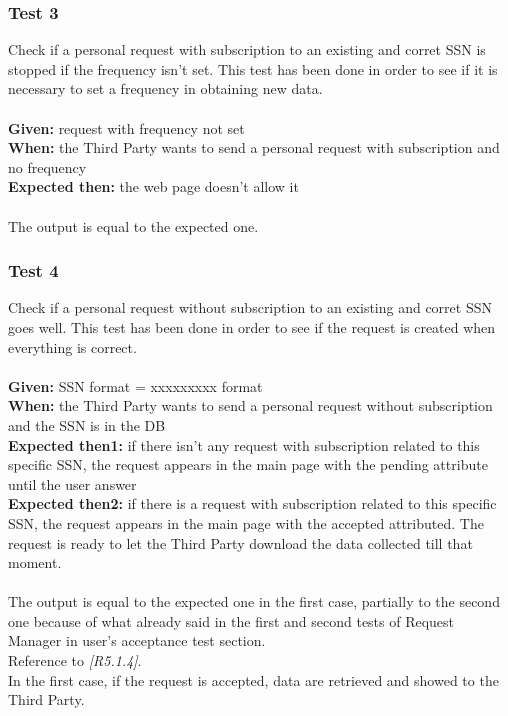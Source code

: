 \subsubsection{\Large{Test 3}}
Check if a personal request with subscription to an existing and corret SSN is stopped if the frequency isn't set. This test has been done in order to see if it is necessary to set a frequency in obtaining new data.\\
\\
\textbf{Given: } request with frequency not set  \\
\textbf{When: } the Third Party wants to send a personal request with subscription and no frequency \\
\textbf{Expected then: } the web page doesn't allow it\\
\\
The output is equal to the expected one.

\subsubsection{\Large{Test 4}}
Check if a personal request without subscription to an existing and corret SSN goes well. This test has been done in order to see if the request is created when everything is correct.\\
\\
\textbf{Given: } SSN format = xxxxxxxxx format \\
\textbf{When: } the Third Party wants to send a personal request without subscription and the SSN is in the DB \\
\textbf{Expected then1: } if there isn't any request with subscription related to this specific SSN, the request appears in the main page with the pending attribute until the user answer\\
\textbf{Expected then2: } if there is a request with subscription related to this specific SSN, the request appears in the main page with the accepted attributed. The request is ready to let the Third Party download the data collected till that moment.\\
\\
The output is equal to the expected one in the first case, partially to the second one because of what already said in the first and second tests of Request Manager in user's acceptance test section.\\ 
Reference to \textit{[R5.1.4]}.\\
In the first case, if the request is accepted, data are retrieved and showed to the Third Party.


